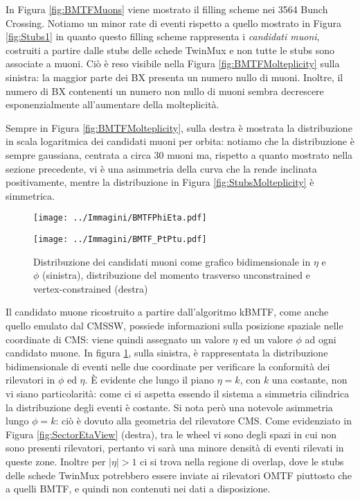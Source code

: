 In Figura \ref{fig:BMTFMuons} viene mostrato il filling scheme nei 3564 Bunch Crossing. Notiamo un minor rate di eventi rispetto a quello mostrato in Figura \ref{fig:Stubs1} in quanto questo filling scheme rappresenta i \textit{candidati muoni}, costruiti a partire dalle stubs delle schede TwinMux e non tutte le stubs sono associate a muoni. Ciò è reso visibile nella Figura \ref{fig:BMTFMolteplicity} sulla sinistra: la maggior parte dei BX presenta un numero nullo di muoni. Inoltre, il numero di BX contenenti un numero non nullo di muoni sembra decrescere esponenzialmente all’aumentare della molteplicità.

Sempre in Figura \ref{fig:BMTFMolteplicity}, sulla destra è mostrata la distribuzione in scala logaritmica dei candidati muoni per orbita: notiamo che la distribuzione è sempre gaussiana, centrata a circa 30 muoni ma, rispetto a quanto mostrato nella sezione precedente, vi è una asimmetria della curva che la rende inclinata positivamente, mentre la distribuzione in Figura \ref{fig:StubsMolteplicity} è simmetrica.

\begin{figure}[t]
  \centering
  \begin{minipage}[b]{0.51\textwidth}
    \centering
    \texttt{[image: ../Immagini/BMTFPhiEta.pdf]} 
    \end{minipage}
    \hfill 
    \begin{minipage}[b]{0.48\textwidth}
      \centering
      \texttt{[image: ../Immagini/BMTF\_PtPtu.pdf]} 
    \end{minipage}
    \caption{Distribuzione dei candidati muoni come grafico bidimensionale in $\eta$ e $\phi$ (sinistra), distribuzione del momento trasverso unconstrained e vertex-constrained (destra)}
  \label{fig:BMTFPt}
\end{figure}

Il candidato muone ricostruito a partire dall'algoritmo kBMTF, come anche quello emulato dal CMSSW, possiede informazioni sulla posizione spaziale nelle coordinate di CMS: viene quindi assegnato un valore $\eta$ ed un valore $\phi$ ad ogni candidato muone. In figura \ref{fig:BMTFPt}, sulla sinistra, è rappresentata la distribuzione bidimensionale di eventi nelle due coordinate per verificare la conformità dei rilevatori in $\phi$ ed $\eta$. È evidente che lungo il piano $\eta = k$, con $k$ una costante, non vi siano particolarità: come ci si aspetta essendo il sistema a simmetria cilindrica la distribuzione degli eventi è costante. Si nota però una notevole asimmetria lungo $\phi = k$: ciò è dovuto alla geometria del rilevatore CMS. Come evidenziato in Figura \ref{fig:SectorEtaView} (destra), tra le wheel vi sono degli spazi in cui non sono presenti rilevatori, pertanto vi sarà una minore densità di eventi rilevati in queste zone. Inoltre per $|\eta| > 1$ ci si trova nella regione di overlap, dove le stubs delle schede TwinMux potrebbero essere inviate ai rilevatori OMTF piuttosto che a quelli BMTF, e quindi non contenuti nei dati a disposizione.

